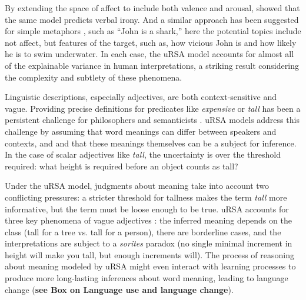 \documentclass[]{elsarticle}
\begin{document}
By extending
the space of affect to include both valence and arousal, \citet{kao2015} showed that the same model predicts verbal irony. And a similar approach has been suggested for simple
metaphors \cite{kao2014b}, such as ``John is a shark,''
here the potential topics include not affect, but features of the
target, such as, how vicious John is and how likely he is to swim
underwater. In each case, the uRSA model accounts for almost all of the explainable variance in
human interpretations, a striking result considering the complexity and subtlety of these phenomena.

Linguistic descriptions, especially adjectives, are both context-sensitive and vague. Providing precise definitions for predicates like \emph{expensive} or \emph{tall} has been a persistent challenge for philosophers and semanticists \citep{williamson2002}. uRSA models address this challenge by assuming that word meanings can differ between speakers and contexts, and and that these meanings themselves can be a subject for inference. In the case of scalar adjectives like \emph{tall}, the uncertainty is over the threshold required: what height is required before an object counts as tall?

Under the uRSA model, judgments about meaning take into account two conflicting pressures: a stricter threshold for tallness makes the term \emph{tall} more informative, but the term must be loose enough to be true. uRSA accounts for three key phenomena of vague adjectives \citep{lassiter2015}: the inferred meaning depends on the class (tall for a tree vs. tall for a person), there are borderline cases, and the interpretations are subject to a \emph{sorites} paradox (no single minimal increment in height will make you tall, but enough increments will). The process of reasoning about meaning modeled by uRSA might even interact with learning processes to produce more long-lasting inferences about word meaning, leading to language change (\textbf{see Box on Language use and language change}).



\end{document}
